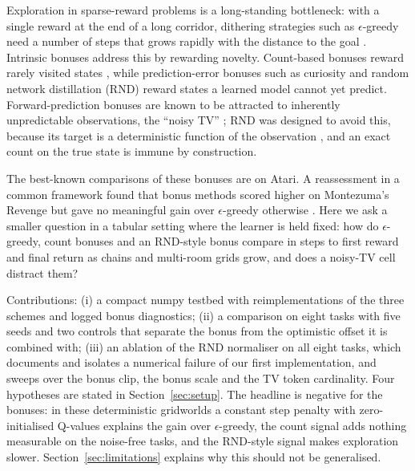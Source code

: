 Exploration in sparse-reward problems is a long-standing bottleneck: with a single reward at the end of a long corridor, dithering strategies such as $\epsilon$-greedy need a number of steps that grows rapidly with the distance to the goal \cite{osband2016deep}. Intrinsic bonuses address this by rewarding novelty. Count-based bonuses reward rarely visited states \cite{strehl2008analysis,bellemare2016unifying,tang2016exploration,ostrovski2017count}, while prediction-error bonuses such as curiosity \cite{pathak2017curiosity,burda2018large} and random network distillation (RND) \cite{burda2018exploration} reward states a learned model cannot yet predict. Forward-prediction bonuses are known to be attracted to inherently unpredictable observations, the ``noisy TV'' \cite{burda2018large,mavorparker2021how}; RND was designed to avoid this, because its target is a deterministic function of the observation \cite{burda2018exploration}, and an exact count on the true state is immune by construction.

The best-known comparisons of these bonuses are on Atari. A reassessment in a common framework found that bonus methods scored higher on Montezuma's Revenge but gave no meaningful gain over $\epsilon$-greedy otherwise \cite{taga2021bonus}. Here we ask a smaller question in a tabular setting where the learner is held fixed: how do $\epsilon$-greedy, count bonuses and an RND-style bonus compare in steps to first reward and final return as chains and multi-room grids grow, and does a noisy-TV cell distract them?

Contributions: (i) a compact numpy testbed with reimplementations of the three schemes and logged bonus diagnostics; (ii) a comparison on eight tasks with five seeds and two controls that separate the bonus from the optimistic offset it is combined with; (iii) an ablation of the RND normaliser on all eight tasks, which documents and isolates a numerical failure of our first implementation, and sweeps over the bonus clip, the bonus scale and the TV token cardinality. Four hypotheses are stated in Section~\ref{sec:setup}. The headline is negative for the bonuses: in these deterministic gridworlds a constant step penalty with zero-initialised Q-values explains the gain over $\epsilon$-greedy, the count signal adds nothing measurable on the noise-free tasks, and the RND-style signal makes exploration slower. Section~\ref{sec:limitations} explains why this should not be generalised.
